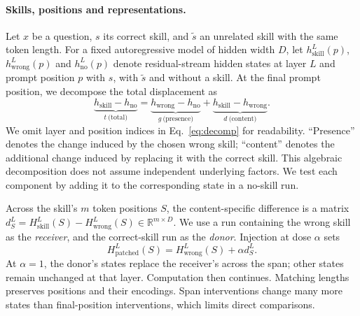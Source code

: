\documentclass{article}
\newcommand{\dvec}{\ensuremath{d}}
\newcommand{\gvec}{\ensuremath{g}}
\newcommand{\tvec}{\ensuremath{t}}
\begin{document}
\paragraph{Skills, positions and representations.}
Let $x$ be a question, $s$ its correct skill, and $\tilde{s}$ an unrelated skill
with the same token length. For a fixed autoregressive model of hidden width
$D$, let $h^L_{\mathrm{skill}}(p)$, $h^L_{\mathrm{wrong}}(p)$ and
$h^L_{\mathrm{no}}(p)$ denote residual-stream hidden states at layer $L$ and prompt position
$p$ with $s$, with $\tilde{s}$ and without a skill. At the final prompt position,
we decompose the total displacement as
\begin{equation}
\underbrace{h_{\mathrm{skill}}-h_{\mathrm{no}}}_{\tvec\ \text{(total)}}
=
\underbrace{h_{\mathrm{wrong}}-h_{\mathrm{no}}}_{\gvec\ \text{(presence)}}
+
\underbrace{h_{\mathrm{skill}}-h_{\mathrm{wrong}}}_{\dvec\ \text{(content)}}.
\label{eq:decomp}
\end{equation}
We omit layer and position indices in Eq.~\ref{eq:decomp} for readability.
``Presence'' denotes the change induced by the chosen wrong skill; ``content''
denotes the additional change induced by replacing it with the correct skill.
This algebraic decomposition does not assume independent underlying factors.
We test each component by adding it to the corresponding state in a no-skill run.

Across the skill's $m$ token positions $S$, the content-specific difference
is a matrix $\dvec_S^L=H^L_{\mathrm{skill}}(S)-H^L_{\mathrm{wrong}}(S)
\in\mathbb{R}^{m\times D}$. We use a run containing the wrong skill as the
\emph{receiver}, and the correct-skill run as the \emph{donor}. Injection at dose
$\alpha$ sets
\begin{equation}
H^L_{\mathrm{patched}}(S)=H^L_{\mathrm{wrong}}(S)+\alpha\dvec_S^L.
\label{eq:inject}
\end{equation}
At $\alpha=1$, the donor's states replace the receiver's across the span;
other states remain unchanged at that layer. Computation then continues.
Matching lengths preserves positions and their encodings. Span interventions
change many more states than final-position interventions, which limits direct
comparisons.
\end{document}
